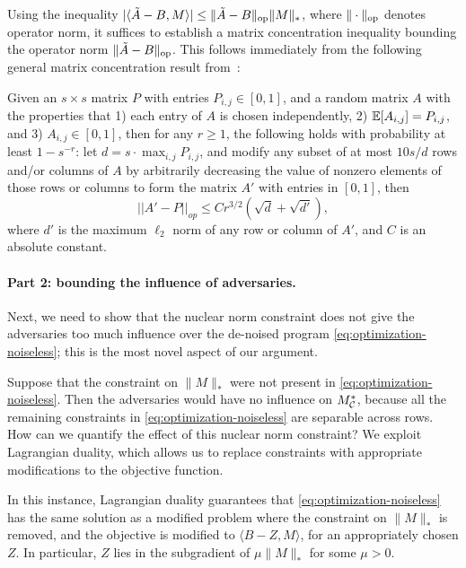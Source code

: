 Using the inequality $|\langle \tilde{A} - B, M \rangle| \leq \|\tilde{A}-B\|_{\mathrm{op}}\|M\|_*$, 
where $\|\cdot\|_{\mathrm{op}}$ denotes operator norm, it suffices to establish a matrix 
concentration inequality bounding the operator norm $\|\tilde{A} - B\|_{\mathrm{op}}$.   This follows immediately from the following general matrix concentration result from~\cite{Le2015}:

\begin{theorem}
Given an $s \times s$ matrix $P$ with entries $P_{i,j} \in [0,1]$, and a random matrix $A$ with the properties that 1) each entry of $A$ is chosen independently, 2) $\mathbb{E}[A_{i,j}] = P_{i,j}$, and 3) $A_{i,j} \in [0,1]$, then for any $r \ge 1$, the following holds with probability at least $1-s^{-r}$:  let $d = s \cdot \max_{i,j} P_{i,j}$, and modify any subset of at most $10s/d$ rows and/or columns of $A$ by arbitrarily decreasing the value of nonzero elements of those rows or columns to form the matrix $A'$ with entries in $[0,1]$, then $$||A' - P||_{op} \le C r^{3/2}\left(\sqrt{d} + \sqrt{d'}\right),$$ where $d'$ is the maximum $\ell_2$ norm of any row or column of $A'$, and $C$ is an absolute constant.
\end{theorem}

\paragraph{Part 2: bounding the influence of adversaries.} 
Next, we need to show that the nuclear norm constraint does 
not give the adversaries too much influence over the de-noised program 
\eqref{eq:optimization-noiseless}; this is the most novel aspect 
of our argument.

Suppose that the constraint on $\|M\|_*$ were not present in 
\eqref{eq:optimization-noiseless}. Then the adversaries would have 
no influence on $M^*_{\mathcal{C}}$, because all the remaining constraints 
in \eqref{eq:optimization-noiseless} are separable across rows. 
How can we quantify the effect of this nuclear norm constraint?
We exploit Lagrangian duality, which allows us to replace constraints 
with appropriate modifications to the objective function.



In this instance, 
Lagrangian duality guarantees that \eqref{eq:optimization-noiseless} has the 
same solution as a modified problem where the constraint on $\|M\|_*$ is removed, 
and the objective is modified to $\langle B - Z, M \rangle$, for an appropriately 
chosen $Z$. In particular, $Z$ lies in the subgradient of 
$\mu \|M\|_*$ for some $\mu > 0$.

